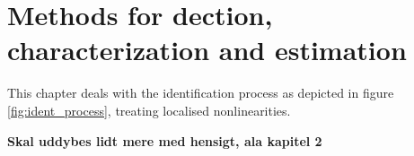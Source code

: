 
\chapter{Methods for dection, characterization and estimation}
\label{chap:methods_dec_char_est}

This chapter deals with the identification process as depicted in figure
\ref{fig:ident_process}, treating localised nonlinearities.

\textbf{Skal uddybes lidt mere med hensigt, ala kapitel 2}




